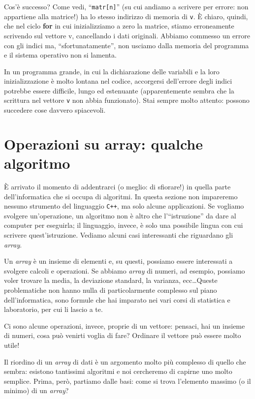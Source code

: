 Cos'è successo? Come vedi, ``\verb|matr[n]|'' (su cui andiamo a scrivere per errore: non appartiene alla matrice!) ha lo stesso indirizzo di memoria di \verb|v|. È chiaro, quindi, che nel ciclo \textbf{for} in cui inizializziamo a zero la matrice, stiamo erroneamente scrivendo sul vettore v, cancellando i dati originali. Abbiamo commesso un errore con gli indici ma, ``sfortunatamente'', non usciamo dalla memoria del programma e il sistema operativo non si lamenta. 

In un programma grande, in cui la dichiarazione delle variabili e la loro inizializzazione è molto lontana nel codice, accorgersi dell'errore degli indici potrebbe essere difficile, lungo ed estenuante (apparentemente sembra che la scrittura nel vettore \verb|v| non abbia funzionato). Stai sempre molto attento: possono succedere cose davvero spiacevoli.

\section{Operazioni su array: qualche algoritmo}
È arrivato il momento di addentrarci (o meglio: di sfiorare!) in quella parte dell'informatica che si occupa di algoritmi. In questa sezione non impareremo nessuno strumento del linguaggio \verb|C++|, ma solo alcune applicazioni. Se vogliamo svolgere un'operazione, un algoritmo non è altro che l'``istruzione'' da dare al computer per eseguirla; il linguaggio, invece, è solo una possibile lingua con cui scrivere quest'istruzione. Vediamo alcuni casi interessanti che riguardano gli \emph{array}.

Un \emph{array} è un insieme di elementi e, su questi, possiamo essere interessati a svolgere calcoli e operazioni. Se abbiamo \emph{array} di numeri, ad esempio, possiamo voler trovare la media, la deviazione standard, la varianza, ecc\ldots Queste problematiche non hanno nulla di particolarmente complesso sul piano dell'informatica, sono formule che hai imparato nei vari corsi di statistica e laboratorio, per cui li lascio a te.

Ci sono alcune operazioni, invece, proprie di un vettore: pensaci, hai un insieme di numeri, cosa può venirti voglia di fare? Ordinare il vettore può essere molto utile!

Il riordino di un \emph{array} di dati è un argomento molto più complesso di quello che sembra: esistono tantissimi algoritmi e noi cercheremo di capirne uno molto semplice. Prima, però, partiamo dalle basi: come si trova l'elemento massimo (o il minimo) di un \emph{array}?

